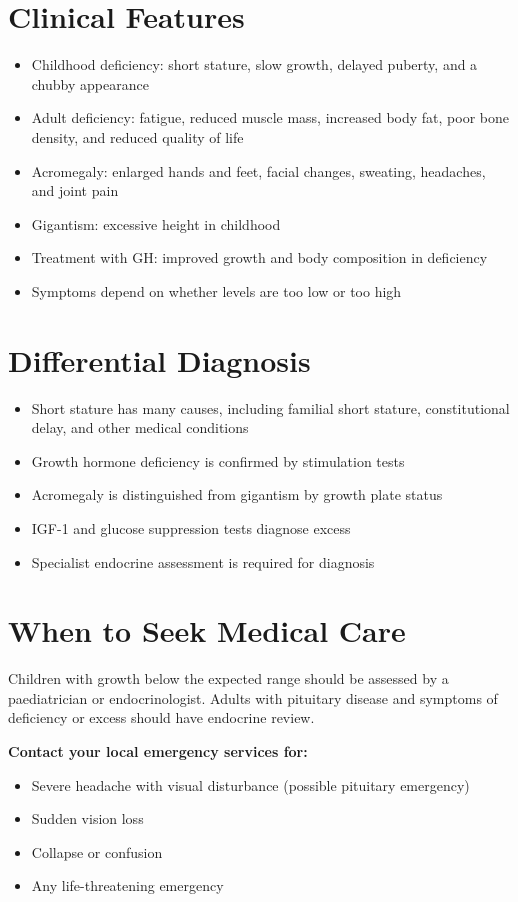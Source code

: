 \section*{Clinical Features}
\begin{itemize}
    \item Childhood deficiency: short stature, slow growth, delayed puberty, and a chubby appearance
    \item Adult deficiency: fatigue, reduced muscle mass, increased body fat, poor bone density, and reduced quality of life
    \item Acromegaly: enlarged hands and feet, facial changes, sweating, headaches, and joint pain
    \item Gigantism: excessive height in childhood
    \item Treatment with GH: improved growth and body composition in deficiency
    \item Symptoms depend on whether levels are too low or too high
\end{itemize}

\section*{Differential Diagnosis}
\begin{itemize}
    \item Short stature has many causes, including familial short stature, constitutional delay, and other medical conditions
    \item Growth hormone deficiency is confirmed by stimulation tests
    \item Acromegaly is distinguished from gigantism by growth plate status
    \item IGF-1 and glucose suppression tests diagnose excess
    \item Specialist endocrine assessment is required for diagnosis
\end{itemize}

\section*{When to Seek Medical Care}
Children with growth below the expected range should be assessed by a paediatrician or endocrinologist. Adults with pituitary disease and symptoms of deficiency or excess should have endocrine review.

\textbf{Contact your local emergency services for:}
\begin{itemize}
    \item Severe headache with visual disturbance (possible pituitary emergency)
    \item Sudden vision loss
    \item Collapse or confusion
    \item Any life-threatening emergency
\end{itemize}

